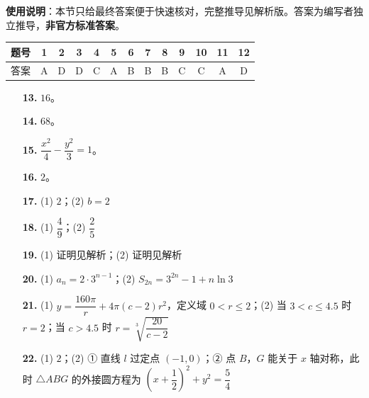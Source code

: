 
\begin{gknotice}
\textbf{使用说明}：本节只给最终答案便于快速核对，完整推导见解析版。答案为编写者独立推导，\textbf{非官方标准答案}。
\end{gknotice}

\begin{center}\begin{tabular}{ccccccccccccc}
\toprule
题号 & 1 & 2 & 3 & 4 & 5 & 6 & 7 & 8 & 9 & 10 & 11 & 12 \\
\midrule
答案 & A & D & D & C & A & B & B & B & C & C & A & D \\
\bottomrule
\end{tabular}\end{center}

\begin{itemize}[leftmargin=2.6em]
  \item[\textbf{13.}] $16$。
  \item[\textbf{14.}] $68$。
  \item[\textbf{15.}] $\dfrac{x^2}{4}-\dfrac{y^2}{3}=1$。
  \item[\textbf{16.}] $2$。
\end{itemize}

\begin{itemize}[leftmargin=2.6em]
  \item[\textbf{17.}] (1) $2$；(2) $b=2$
  \item[\textbf{18.}] (1) $\dfrac49$；(2) $\dfrac25$
  \item[\textbf{19.}] (1) 证明见解析；(2) 证明见解析
  \item[\textbf{20.}] (1) $a_n=2\cdot3^{n-1}$；(2) $S_{2n}=3^{2n}-1+n\ln3$
  \item[\textbf{21.}] (1) $y=\dfrac{160\pi}{r}+4\pi(c-2)r^2$，定义域 $0<r\leqslant2$；(2) 当 $3<c\leqslant4.5$ 时 $r=2$；当 $c>4.5$ 时 $r=\sqrt[3]{\dfrac{20}{c-2}}$
  \item[\textbf{22.}] (1) $2$；(2) ① 直线 $l$ 过定点 $(-1,0)$；② 点 $B$，$G$ 能关于 $x$ 轴对称，此时 $\triangle ABG$ 的外接圆方程为 $\left(x+\dfrac12\right)^2+y^2=\dfrac54$
\end{itemize}

